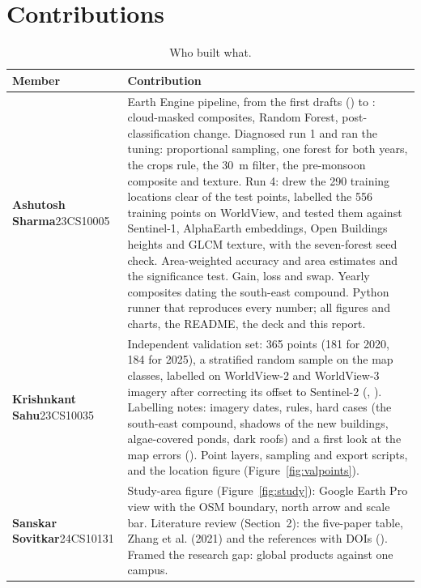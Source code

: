 \documentclass[11pt,a4paper]{article}
\begin{document}
\section{Contributions}
\begin{table}[htbp]
\centering\small
\caption{Who built what.}
\label{tab:contrib}
\begin{tabularx}{\linewidth}{@{}>{\raggedright\arraybackslash}p{2.9cm}Y@{}}
\toprule
Member & Contribution\\
\midrule
\textbf{Ashutosh Sharma}\newline 23CS10005 &
Earth Engine pipeline, from the first drafts () to : cloud-masked composites, Random Forest, post-classification change. Diagnosed run 1 and ran the tuning: proportional sampling, one forest for both years, the crops rule, the 30~m filter, the pre-monsoon composite and texture. Run 4: drew the 290 training locations clear of the test points, labelled the 556 training points on WorldView, and tested them against Sentinel-1, AlphaEarth embeddings, Open Buildings heights and GLCM texture, with the seven-forest seed check. Area-weighted accuracy and area estimates \citep{olofsson2014,stehman2014} and the significance test. Gain, loss and swap. Yearly composites dating the south-east compound. Python runner that reproduces every number; all figures and charts, the README, the deck and this report.\\
\addlinespace
\textbf{Krishnkant Sahu}\newline 23CS10035 &
Independent validation set: 365 points (181 for 2020, 184 for 2025), a stratified random sample on the map classes, labelled on WorldView-2 and WorldView-3 imagery after correcting its offset to Sentinel-2 (, ). Labelling notes: imagery dates, rules, hard cases (the south-east compound, shadows of the new buildings, algae-covered ponds, dark roofs) and a first look at the map errors (). Point layers, sampling and export scripts, and the location figure (Figure~\ref{fig:valpoints}).\\
\addlinespace
\textbf{Sanskar Sovitkar}\newline 24CS10131 &
Study-area figure (Figure~\ref{fig:study}): Google Earth Pro view with the OSM boundary, north arrow and scale bar. Literature review (Section~2): the five-paper table, Zhang et al. (2021) and the references with DOIs (). Framed the research gap: global products against one campus.\\
\bottomrule
\end{tabularx}
\end{table}
\end{document}
